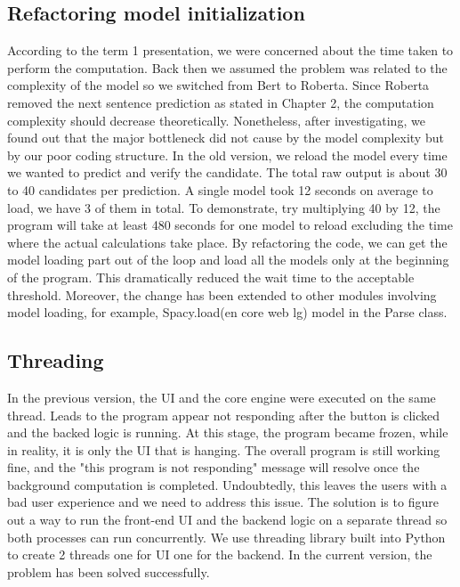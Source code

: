 \documentclass[12pt,oneside,openright,a4paper]{cpe-english-project}
\begin{document}
\subsection{Refactoring model initialization }
According to the term 1 presentation, we were concerned about the time taken to perform the computation. Back then we assumed the problem was related to the complexity of the model so we switched from Bert to Roberta. Since Roberta removed the next sentence prediction as stated in Chapter 2, the computation complexity should decrease theoretically. Nonetheless, after investigating, we found out that the major bottleneck did not cause by the model complexity but by our poor coding structure. In the old version, we reload the model every time we wanted to predict and verify the candidate. The total raw output is about 30 to 40 candidates per prediction. A single model took 12 seconds on average to load, we have 3 of them in total. To demonstrate, try multiplying 40 by 12, the program will take at least 480 seconds for one model to reload excluding the time where the actual calculations take place. By refactoring the code, we can get the model loading part out of the loop and load all the models only at the beginning of the program. This dramatically reduced the wait time to the acceptable threshold. Moreover, the change has been extended to other modules involving model loading, for example, Spacy.load(en core web lg) model in the Parse class.

\subsection{Threading}
In the previous version, the UI and the core engine were executed on the same thread. Leads to the program appear not responding after the button is clicked and the backed logic is running. At this stage, the program became frozen, while in reality, it is only the UI that is hanging. The overall program is still working fine, and the "this program is not responding" message will resolve once the background computation is completed. Undoubtedly, this leaves the users with a bad user experience and we need to address this issue. The solution is to figure out a way to run the front-end UI and the backend logic on a separate thread so both processes can run concurrently. We use threading library built into Python to create 2 threads one for UI one for the backend. In the current version, the problem has been solved successfully.
\end{document}
